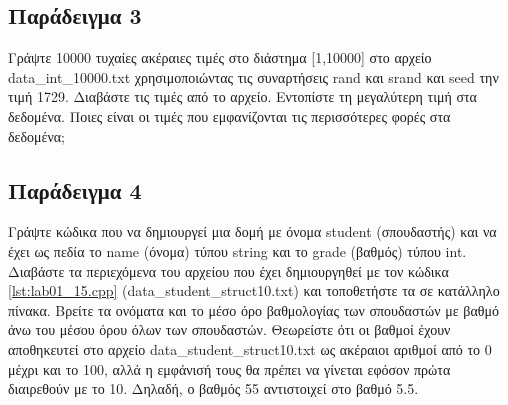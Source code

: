 



\subsection{Παράδειγμα 3}
Γράψτε 10000 τυχαίες ακέραιες τιμές στο διάστημα [1,10000] στο αρχείο data\_int\_10000.txt χρησιμοποιώντας τις συναρτήσεις rand και srand και seed την τιμή 1729. Διαβάστε τις τιμές από το αρχείο. Εντοπίστε τη μεγαλύτερη τιμή στα δεδομένα. Ποιες είναι οι τιμές  που εμφανίζονται τις περισσότερες φορές στα δεδομένα;




 
\subsection{Παράδειγμα 4}
Γράψτε κώδικα που να δημιουργεί μια δομή με όνομα student (σπουδαστής) και να έχει ως πεδία το name (όνομα) τύπου string και το grade (βαθμός) τύπου int. Διαβάστε τα περιεχόμενα του αρχείου που έχει δημιουργηθεί με τον κώδικα \ref{lst:lab01_15.cpp} (data\_student\_struct10.txt) και τοποθετήστε τα σε κατάλληλο πίνακα. Βρείτε τα ονόματα και το μέσο όρο βαθμολογίας των σπουδαστών με βαθμό άνω του μέσου όρου όλων των σπουδαστών. Θεωρείστε ότι οι βαθμοί έχουν αποθηκευτεί στο αρχείο data\_student\_struct10.txt ως ακέραιοι αριθμοί από το 0 μέχρι και το 100, αλλά η εμφάνισή τους θα πρέπει να γίνεται εφόσον πρώτα διαιρεθούν με το 10. Δηλαδή, ο βαθμός 55 αντιστοιχεί στο βαθμό 5.5.





